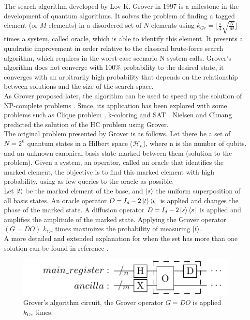 \documentclass[10pt,a4paper]{article}
\begin{document}
The search algorithm developed by Lov K. Grover in 1997 \cite{Grover1} is a milestone in the development of quantum algorithms. It solves the problem of finding a tagged element (or $M$ elements) in a disordered set of $N$ elements using $k_{Gr}= \lfloor\frac{\pi}{4} \sqrt{\frac{N}{M}}\rfloor$ times a system, called oracle, which is able to identify this element. It presents a quadratic improvement in order relative to the classical brute-force search algorithm, which requires in the worst-case scenario N system calls. Grover's algorithm does not converge with 100\% probability to the desired state, it converges with an arbitrarily high probability that depends on the relationship between solutions and the size of the search space.\\
As Grover proposed later, the algorithm can be used to speed up the solution of NP-complete problems \cite{Grover2}. Since, its application has been explored with some problems such as Clique problem \cite{Clique, Clique2}, k-coloring \cite{Coloring1, Coloring2} and SAT \cite{SAT_ions, SAT_paralel}. Nielsen and Chuang predicted the solution of the HC problem using Grover\cite{Nielsen_Chuang_2010}.\\
The original problem presented by Grover \cite{Grover1} is as follows. Let there be a set of $N = 2^n$ quantum states in a Hilbert space ($\mathcal{H}_n$), where n is the number of qubits, and an unknown canonical basis state marked between them (solution to the problem). Given a system, an operator, called an oracle that identifies the marked element, the objective is to find this marked element with high probability, using as few queries to the oracle as possible.\\
Let $\ket{t}$ be the marked element of the base, and $\ket{s}$ the uniform superposition of all basis states. An oracle operator $O = I_d - 2\ket{t}\bra{t}$ is applied and changes the phase of the marked state. A diffusion operator $D = I_d - 2\ket{s}\bra{s}$ is applied and amplifies the amplitude of the marked state. Applying the Grover operator $(G=DO)$ $k_{Gr}$ times maximizes the probability of measuring $\ket{t}$.\\
A more detailed and extended explanation for when the set has more than one solution can be found in reference \cite{Nielsen_Chuang_2010}.

\begin{figure}[hbtp]
\centering
\includegraphics[scale=1.5]{figures/grover.pdf}
\caption{Grover's algorithm circuit, the Grover operator $G = DO$ is applied $k_{Gr}$ times.}
\end{figure}
\end{document}
